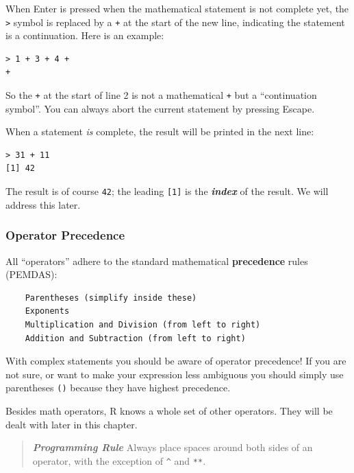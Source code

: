 \documentclass[]{book}
\begin{document}
When Enter is pressed when the mathematical statement is not complete yet, the \texttt{\textgreater{}} symbol is replaced by a \texttt{+} at the start of the new line, indicating the statement is a continuation. Here is an example:

\begin{verbatim}
> 1 + 3 + 4 + 
+ 
\end{verbatim}

So the \texttt{+} at the start of line 2 is not a mathematical \texttt{+} but a ``continuation symbol''. You can always abort the current statement by pressing Escape.

When a statement \emph{is} complete, the result will be printed in the next line:

\begin{verbatim}
> 31 + 11
[1] 42
\end{verbatim}

The result is of course \texttt{42}; the leading \texttt{{[}1{]}} is the \textbf{\emph{index}} of the result. We will address this later.

\hypertarget{operator-precedence}{%
\subsubsection*{Operator Precedence}\label{operator-precedence}}

All ``operators'' adhere to the standard mathematical \textbf{precedence} rules (PEMDAS):

\begin{verbatim}
    Parentheses (simplify inside these)
    Exponents
    Multiplication and Division (from left to right)
    Addition and Subtraction (from left to right)
\end{verbatim}

With complex statements you should be aware of operator precedence! If you are not sure, or want to make your expression less ambiguous you should simply use parentheses \texttt{()} because they have highest precedence.

Besides math operators, R knows a whole set of other operators. They will be dealt with later in this chapter.

\begin{quote}
\textbf{\emph{Programming Rule}} Always place spaces around both sides of an operator, with the exception of \texttt{\^{}} and \texttt{**}.
\end{quote}
\end{document}
